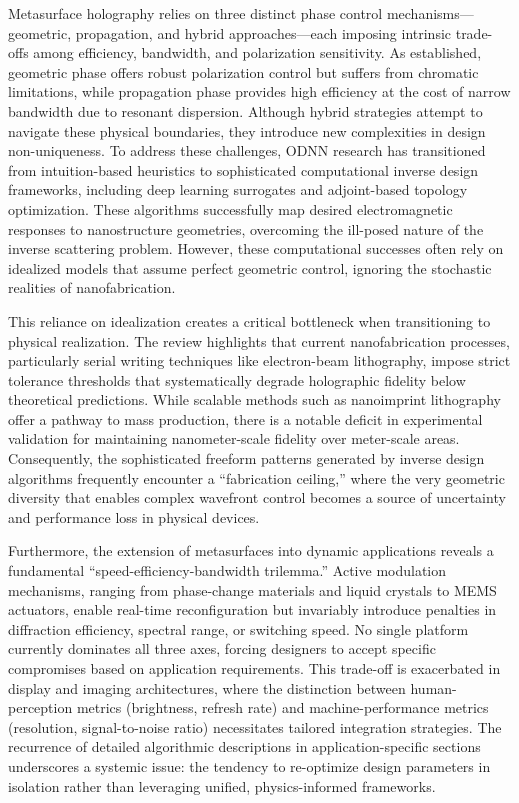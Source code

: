 Metasurface holography relies on three distinct phase control mechanisms---geometric, propagation, and hybrid approaches---each imposing intrinsic trade-offs among efficiency, bandwidth, and polarization sensitivity. As established, geometric phase offers robust polarization control but suffers from chromatic limitations, while propagation phase provides high efficiency at the cost of narrow bandwidth due to resonant dispersion. Although hybrid strategies attempt to navigate these physical boundaries, they introduce new complexities in design non-uniqueness. To address these challenges, ODNN research has transitioned from intuition-based heuristics to sophisticated computational inverse design frameworks, including deep learning surrogates and adjoint-based topology optimization. These algorithms successfully map desired electromagnetic responses to nanostructure geometries, overcoming the ill-posed nature of the inverse scattering problem. However, these computational successes often rely on idealized models that assume perfect geometric control, ignoring the stochastic realities of nanofabrication.

This reliance on idealization creates a critical bottleneck when transitioning to physical realization. The review highlights that current nanofabrication processes, particularly serial writing techniques like electron-beam lithography, impose strict tolerance thresholds that systematically degrade holographic fidelity below theoretical predictions. While scalable methods such as nanoimprint lithography offer a pathway to mass production, there is a notable deficit in experimental validation for maintaining nanometer-scale fidelity over meter-scale areas. Consequently, the sophisticated freeform patterns generated by inverse design algorithms frequently encounter a ``fabrication ceiling,'' where the very geometric diversity that enables complex wavefront control becomes a source of uncertainty and performance loss in physical devices.

Furthermore, the extension of metasurfaces into dynamic applications reveals a fundamental ``speed-efficiency-bandwidth trilemma.'' Active modulation mechanisms, ranging from phase-change materials and liquid crystals to MEMS actuators, enable real-time reconfiguration but invariably introduce penalties in diffraction efficiency, spectral range, or switching speed. No single platform currently dominates all three axes, forcing designers to accept specific compromises based on application requirements. This trade-off is exacerbated in display and imaging architectures, where the distinction between human-perception metrics (brightness, refresh rate) and machine-performance metrics (resolution, signal-to-noise ratio) necessitates tailored integration strategies. The recurrence of detailed algorithmic descriptions in application-specific sections underscores a systemic issue: the tendency to re-optimize design parameters in isolation rather than leveraging unified, physics-informed frameworks.

